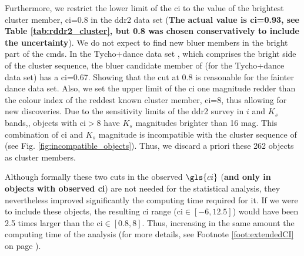 Furthermore, we restrict the lower limit of the \gls{ci} to the value of the brightest cluster member, \gls{ci}=0.8 in the \gls{ddr2} data set (\textbf{The actual value is \gls{ci}=0.93, see Table \ref{tab:rddr2_cluster}, but 0.8 was chosen conservatively to include the uncertainty}). We do not expect to find new bluer members in the bright part of the \glspl{cmd}. In the Tycho+\gls{dance} data set \citep{Bouy2015}, which comprises the bright side of the cluster sequence, the bluer candidate member of \citet{Bouy2015} (for the Tycho+\gls{dance} data set) has a \gls{ci}=0.67. Showing that the cut at 0.8 is reasonable for the fainter \gls{dance} data set. Also, we set the upper limit of the \gls{ci} one magnitude redder than the colour index of the reddest known cluster member, \gls{ci}=8, thus allowing for new discoveries. Due to the sensitivity limits of the \gls{ddr2} survey in $i$ and $K_s$ bands,\cite[$i\sim23$ mag and $K_s\sim18$ mag, see Appendix A of][]{Bouy2015}, objects with \gls{ci}$>8$ have $K_s$ magnitudes brighter than 16 mag. This combination of \gls{ci} and $K_s$ magnitude is incompatible with the cluster sequence of \citet{Bouy2015} (see Fig. \ref{fig:incompatible_objects}). Thus, we discard a priori these 262 objects as cluster members. 

Although formally these two cuts in the observed $\gls{ci}$ (\textbf{and only in objects with observed \gls{ci}}) are not needed for the statistical analysis, they nevertheless improved significantly the computing time required for it. If we were to include these objects, the resulting \gls{ci} range (\gls{ci}$\in[-6,12.5]$) would have been 2.5 times larger than the \gls{ci}$\in[0.8,8]$. Thus, increasing in the same amount the computing time of the analysis (for more details, see Footnote \ref{foot:extendedCI} on page \pageref{foot:extendedCI}).

